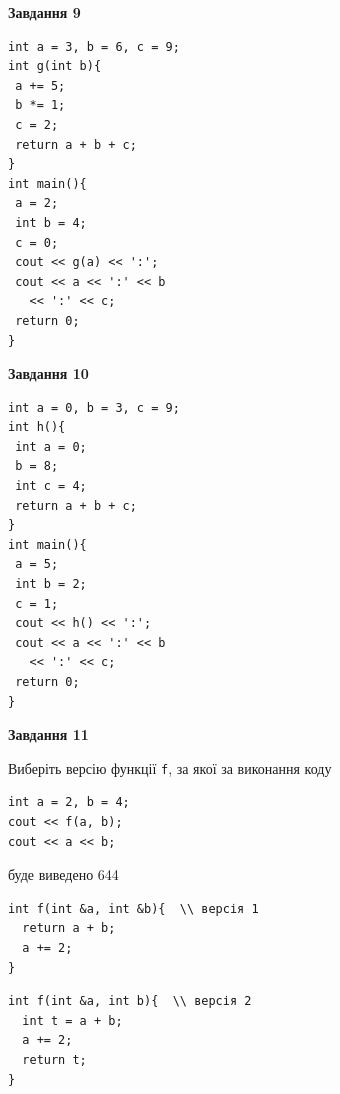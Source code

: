 \documentclass[12pt, ukrainian]{article}
\def\code#1{\Verb!#1!}
\begin{document}
{\begin {large}
\begin{minipage}[t]{11.0cm}
\end{minipage}


\begin{minipage}[t]{7.0cm}

\begin{center}
\textbf{Завдання 9}
\end{center}
\vspace{-8mm}

\begin{verbatim}
int a = 3, b = 6, c = 9;
int g(int b){
 a += 5;
 b *= 1;
 c = 2;
 return a + b + c;
}
int main(){
 a = 2;
 int b = 4;
 c = 0;
 cout << g(a) << ':';
 cout << a << ':' << b 
   << ':' << c;
 return 0;
}
\end{verbatim}



\begin{center}
\textbf{Завдання 10}
\end{center}
\vspace{-8mm}

\begin{verbatim}
int a = 0, b = 3, c = 9;
int h(){
 int a = 0;
 b = 8;
 int c = 4;
 return a + b + c;
}
int main(){
 a = 5;
 int b = 2;
 c = 1;
 cout << h() << ':';
 cout << a << ':' << b 
   << ':' << c;
 return 0;
}
\end{verbatim}

\end{minipage}
\vline \hspace{1mm}
\begin{minipage}[t]{11.0cm}

\begin{center}
\textbf{Завдання 11}
\end{center}
Виберіть версію функції \code{f}, за якої за виконання коду
\begin{verbatim}
int a = 2, b = 4;
cout << f(a, b);
cout << a << b;
\end{verbatim}

буде виведено 644

\begin{verbatim}
int f(int &a, int &b){  \\ версія 1
  return a + b;
  a += 2;
}
\end{verbatim}

\vspace{-8mm}\begin{verbatim}
int f(int &a, int b){  \\ версія 2
  int t = a + b;
  a += 2;
  return t;
}
\end{verbatim}


\end{minipage}
\end{large}}
\end{document}
